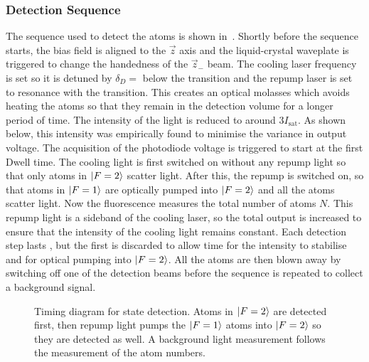 \subsubsection{Detection Sequence}\label{subsec:detection_sequence}
The sequence used to detect the atoms is shown
in~. Shortly before the sequence starts, the
bias field is aligned to the \(\vec{z}\) axis and the liquid-crystal
waveplate is triggered to change the handedness of the \(\vec{z}_-\)
beam. The cooling laser frequency is set so it is detuned by
\(\delta_D =\) 
below the  transition and the repump laser is set to
resonance with the  transition. This creates an optical
molasses which avoids heating the atoms so that they remain in the
detection volume for a longer period of time. The intensity of the
light is reduced to around \(3 I_\text{sat}\). As shown below, this
intensity was empirically found to minimise the variance in output
voltage. The acquisition of the photodiode voltage is
triggered to start at the first Dwell time. The cooling light is first
switched on without any repump light so that only atoms in \(\ket{F=2}\) scatter light. After this, the repump
is switched on, so that atoms in \(\ket{F=1}\) are optically pumped
into \(\ket{F=2}\) and all the atoms scatter light. Now the
fluorescence measures the total number of atoms $N$. This repump light is a
sideband of the cooling laser, so the total output is increased
to ensure that the intensity of the cooling light remains constant.
Each detection step lasts , but the
first  is discarded to allow time for the
intensity to stabilise and for optical pumping into \(\ket{F=2}\).
All the atoms are then blown away by switching off one of the detection
beams before the sequence is repeated to collect a
background signal.
\begin{figure}[!htbp] 
  \centering
  \fontsize{14pt}{14pt}
  \resizebox{0.8\textwidth}{!}{} 
  \caption[State detection sequence timing]{Timing diagram for state
    detection. Atoms in \(\ket{F=2}\) are detected first, then repump
    light pumps the \(\ket{F=1}\) atoms into $\ket{F=2}$ so they are detected as well. A
background light measurement follows the measurement of the atom
numbers.}
	\label{fig:detection} 
\end{figure}

